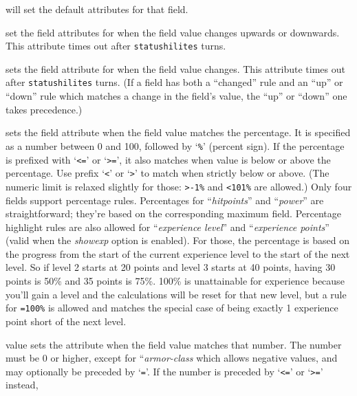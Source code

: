 \documentclass[titlepage]{article}
\begin{document}
\begin{description}[font=\mdseries\ttfamily]
\item[always] will set the default attributes for that field.
\item[up \textrm{\textmd{,}} down] set the field attributes
for when the field value changes upwards or downwards. This attribute
times out after \texttt{statushilites} turns.
\item[changed] sets the field attribute for when the field value
changes. This attribute times out after \texttt{statushilites} turns.
(If a field has both a ``changed'' rule and an ``up'' or ``down''
rule which matches a change in the field's value,
the ``up'' or ``down'' one takes precedence.)
\item[percentage] sets the field attribute when the field value
matches the percentage.
It is specified as a number between 0 and 100, followed by `\texttt{\%}'
(percent sign).
If the percentage is prefixed with `\texttt{<=}' or `\texttt{>=}',
it also matches when value is below or above the percentage.
Use prefix `\texttt{<}' or `\texttt{>}' to match when strictly below or above.
(The numeric limit is relaxed slightly for those: \texttt{>-1\%}
and \texttt{<101\%} are allowed.)
Only four fields support percentage rules.
Percentages for ``\textit{hitpoints}'' and ``\textit{power}'' are
straightforward; they're based on the corresponding maximum field.
Percentage highlight rules are also allowed for ``\textit{experience level}''
and ``\textit{experience points}'' (valid when the
\textit{showexp}
option is enabled).
For those, the percentage is based on the progress from the start of
the current experience level to the start of the next level.
So if level 2 starts at 20 points and level 3 starts at 40 points,
having 30 points is 50\% and 35 points is 75\%.
100\% is unattainable for experience because you'll gain a level and
the calculations will be reset for that new level, but a rule for
\texttt{=100\%} is allowed and matches the special case of being
exactly 1 experience point short of the next level.
\item[absolute] value sets the attribute when the field value
matches that number.
The number must be 0 or higher, except for ``\textit{armor-class} which
allows negative values, and may optionally be preceded by `\texttt{=}'.
If the number is preceded by `\texttt{<=}' or `\texttt{>=}' instead,

\end{description}
\end{document}
